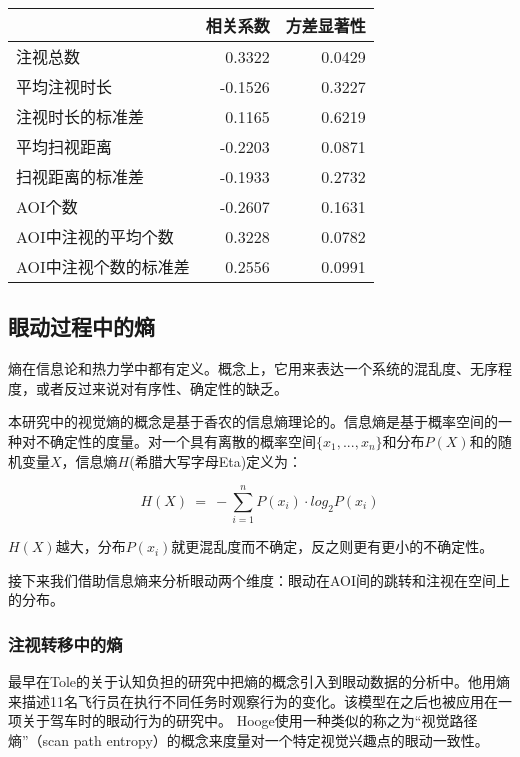 \begin{table}[H]
  \centering
  \begin{tabular}{lrr}
    \hline
     &相关系数 & 方差显著性 \\
    \hline
    注视总数 & 0.3322 & 0.0429 \\
    平均注视时长 & -0.1526 & 0.3227 \\
    注视时长的标准差 & 0.1165 & 0.6219 \\
    平均扫视距离 & -0.2203 & 0.0871 \\
    扫视距离的标准差 & -0.1933 & 0.2732 \\
    AOI个数 & -0.2607 & 0.1631 \\
    AOI中注视的平均个数 & 0.3228 & 0.0782 \\
    AOI中注视个数的标准差 & 0.2556 & 0.0991 \\
    \hline
  \end{tabular}
\end{table}


\subsection{眼动过程中的熵}
熵在信息论和热力学中都有定义。概念上，它用来表达一个系统的混乱度、无序程度，或者反过来说对有序性、确定性的缺乏。

本研究中的视觉熵的概念是基于香农的信息熵理论的。信息熵是基于概率空间的一种对不确定性的度量。对一个具有离散的概率空间$\{x_1, ..., x_n\}$和分布$P(X)$和的随机变量$X$，信息熵$H$(希腊大写字母Eta)定义为：

$$H(X)~=~-\sum_{i=1}^n P(x_i)\cdot log_{2}P(x_i)$$

$H(X)$越大，分布$P(x_i)$就更混乱度而不确定，反之则更有更小的不确定性。

接下来我们借助信息熵来分析眼动两个维度：眼动在AOI间的跳转和注视在空间上的分布。

\subsubsection{注视转移中的熵}
最早在Tole的关于认知负担的研究中把熵的概念引入到眼动数据的分析中。他用熵来描述11名飞行员在执行不同任务时观察行为的变化。该模型在之后也被应用在一项关于驾车时的眼动行为的研究中。
Hooge使用一种类似的称之为“视觉路径熵”（scan path entropy）的概念来度量对一个特定视觉兴趣点的眼动一致性。

